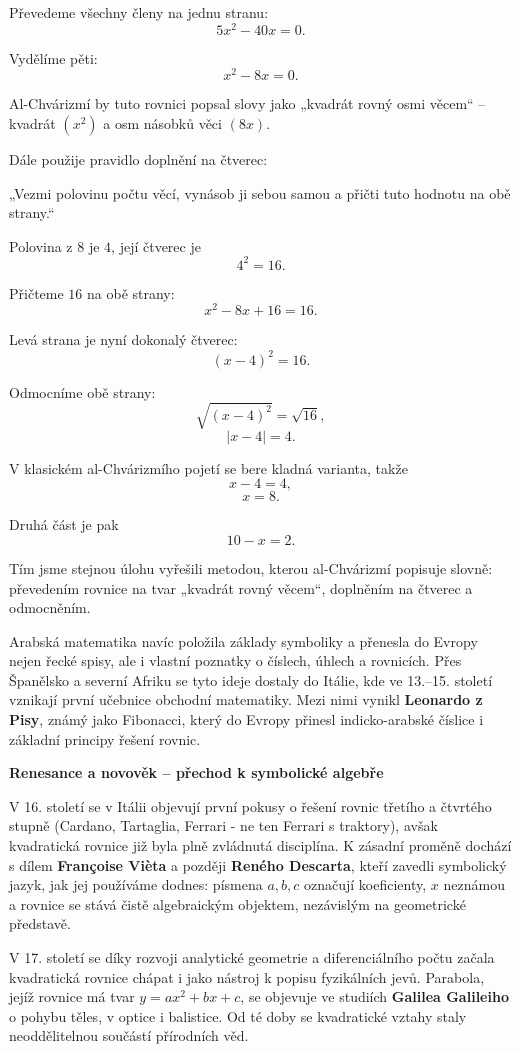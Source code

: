 \documentclass[12pt,a4paper]{article}
\begin{document}
\begin{historicalbox}
Převedeme všechny členy na jednu stranu:
\[
5x^2 - 40x = 0.
\]

Vydělíme pěti:
\[
x^2 - 8x = 0.
\]

Al-Chvárizmí by tuto rovnici popsal slovy jako „kvadrát rovný osmi věcem“ –  
kvadrát \((x^2)\) a osm násobků věci \((8x)\).

Dále použije pravidlo doplnění na čtverec:

„Vezmi polovinu počtu věcí, vynásob ji sebou samou a přičti tuto hodnotu na obě strany.“

Polovina z \(8\) je \(4\), její čtverec je
\[
4^2 = 16.
\]

Přičteme \(16\) na obě strany:
\[
x^2 - 8x + 16 = 16.
\]

Levá strana je nyní dokonalý čtverec:
\[
(x - 4)^2 = 16.
\]

Odmocníme obě strany:
\[
\sqrt{(x - 4)^2} = \sqrt{16},
\]
\[
|x - 4| = 4.
\]

V klasickém al-Chvárizmího pojetí se bere kladná varianta, takže
\[
x - 4 = 4,
\]
\[
x = 8.
\]

Druhá část je pak
\[
10 - x = 2.
\]

Tím jsme stejnou úlohu vyřešili metodou, kterou al-Chvárizmí popisuje slovně:  
převedením rovnice na tvar „kvadrát rovný věcem“, doplněním na čtverec a odmocněním.



\medskip
Arabská matematika navíc položila základy symboliky a 
přenesla do Evropy nejen řecké spisy, ale i vlastní poznatky o číslech, úhlech a rovnicích. 
Přes Španělsko a severní Afriku se tyto ideje dostaly do Itálie, 
kde ve 13.–15. století vznikají první učebnice obchodní matematiky. 
Mezi nimi vynikl \textbf{Leonardo z Pisy}, známý jako Fibonacci, 
který do Evropy přinesl indicko-arabské číslice i základní principy řešení rovnic.

\medskip
\textbf{Renesance a novověk – přechod k symbolické algebře}

V 16. století se v Itálii objevují první pokusy o řešení rovnic třetího a 
čtvrtého stupně (Cardano, Tartaglia, Ferrari - ne ten Ferrari s traktory), 
avšak kvadratická rovnice již byla plně zvládnutá disciplína. 
K zásadní proměně dochází s dílem \textbf{Françoise Vièta} a 
později \textbf{Reného Descarta}, kteří zavedli symbolický jazyk, 
jak jej používáme dodnes: písmena \(a, b, c\) označují koeficienty, 
\(x\) neznámou a rovnice se stává čistě algebraickým objektem, 
nezávislým na geometrické představě.

\medskip
V 17. století se díky rozvoji analytické geometrie a diferenciálního počtu
 začala kvadratická rovnice chápat i jako nástroj k popisu fyzikálních jevů. 
 Parabola, jejíž rovnice má tvar \(y = ax^2 + bx + c\), 
 se objevuje ve studiích \textbf{Galilea Galileiho} o pohybu těles, 
 v optice i balistice. Od té doby se kvadratické vztahy staly neoddělitelnou součástí přírodních věd.



\end{historicalbox}
\end{document}
